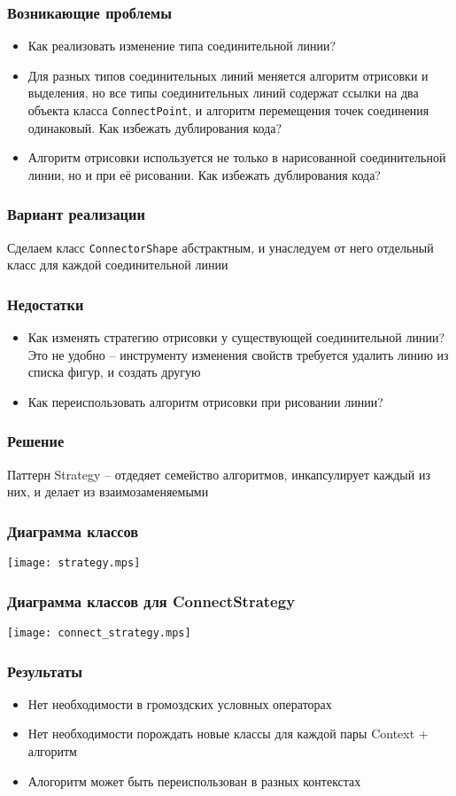 \documentclass[handout]{beamer}
\begin{document}
\begin{frame}[fragile]
\frametitle{Возникающие проблемы}
\begin{itemize}
\item Как реализовать изменение типа соединительной линии?
\item Для разных типов соединительных линий меняется алгоритм отрисовки и выделения,
      но все типы соединительных линий содержат ссылки на два объекта
      класса \lstinline{ConnectPoint}, и алгоритм перемещения точек соединения одинаковый.
      Как избежать дублирования кода?
\item Алгоритм отрисовки используется не только в нарисованной соединительной линии,
      но и при её рисовании. Как избежать дублирования кода?
\end{itemize}
\end{frame}


\begin{frame}[fragile]
\frametitle{Вариант реализации}
Сделаем класс \lstinline{ConnectorShape} абстрактным, и унаследуем от него
      отдельный класс для каждой соединительной линии
\end{frame}



\begin{frame}[fragile]
\frametitle{Недостатки}
\begin{itemize}
\item Как изменять стратегию отрисовки у существующей соединительной линии? Это не удобно --
      инструменту изменения свойств требуется удалить линию из списка фигур, и создать другую
\item Как переиспользовать алгоритм отрисовки при рисовании линии?
\end{itemize}
\end{frame}



\begin{frame}[fragile]
\frametitle{Решение}
Паттерн Strategy -- отдедяет семейство алгоритмов, инкапсулирует каждый из них, и делает
из взаимозаменяемыми
\end{frame}


\begin{frame}[fragile]
\frametitle{Диаграмма классов}
\begin{center}
\texttt{[image: strategy.mps]}
\end{center}
\end{frame}



\begin{frame}[fragile]
\frametitle{Диаграмма классов для ConnectStrategy}
\begin{center}
\texttt{[image: connect\_strategy.mps]}
\end{center}
\end{frame}


\begin{frame}[fragile]
\frametitle{Результаты}
\begin{itemize}
\item Нет необходимости в громоздских условных операторах
\item Нет необходимости порождать новые классы для каждой пары Context + алгоритм
\item Алогоритм может быть переиспользован в разных контекстах
\end{itemize}
\end{frame}
\end{document}
